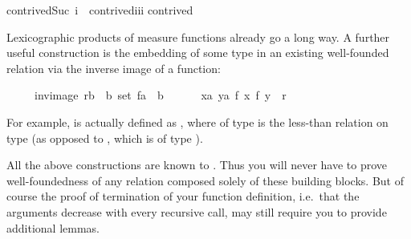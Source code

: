 \begin{isabellebody}
{\isachardoublequote}contrived{\isacharparenleft}Suc\ i{\isacharcomma}{}{\isacharcomma}{}{\isacharparenright}\ {\isacharequal}\ contrived{\isacharparenleft}i{\isacharcomma}i{\isacharcomma}i{\isacharparenright}{\isachardoublequote}\isanewline
{\isachardoublequote}contrived{\isacharparenleft}{}{\isacharcomma}{}{\isacharcomma}{}{\isacharparenright}\ \ \ \ \ {\isacharequal}\ {}{\isachardoublequote}%
\begin{isamarkuptext}%
Lexicographic products of measure functions already go a long way. A
further useful construction is the embedding of some type in an
existing well-founded relation via the inverse image of a function:
\begin{isabelle}%
\ \ \ \ \ inv{\isacharunderscore}image\ {\isacharparenleft}r{\isasymColon}{\isacharparenleft}{\isacharprime}b\ {\isasymtimes}\ {\isacharprime}b{\isacharparenright}\ set{\isacharparenright}\ {\isacharparenleft}f{\isasymColon}{\isacharprime}a\ {\isasymRightarrow}\ {\isacharprime}b{\isacharparenright}\ {\isasymequiv}\isanewline
\ \ \ \ \ {\isacharbraceleft}{\isacharparenleft}x{\isasymColon}{\isacharprime}a{\isacharcomma}\ y{\isasymColon}{\isacharprime}a{\isacharparenright}{\isachardot}\ {\isacharparenleft}f\ x{\isacharcomma}\ f\ y{\isacharparenright}\ {\isasymin}\ r{\isacharbraceright}%
\end{isabelle}
\begin{sloppypar}
\noindent
For example,  is actually defined as , where
 of type  is the less-than relation on type 
(as opposed to , which is of type ).
\end{sloppypar}


All the above constructions are known to . Thus you
will never have to prove well-foundedness of any relation composed
solely of these building blocks. But of course the proof of
termination of your function definition, i.e.\ that the arguments
decrease with every recursive call, may still require you to provide
additional lemmas.


\end{isamarkuptext}
\end{isabellebody}
